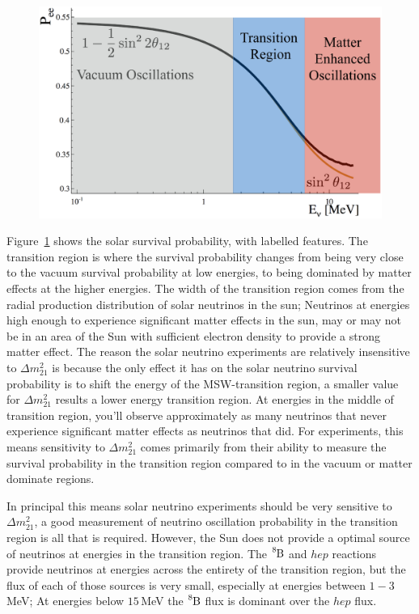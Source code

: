 \begin{figure}[htbp]
    \centering
    \includegraphics[width=\textwidth]{labelled_survival_probability}
    \caption[]{}
    \label{fig:labelled_pee}
\end{figure}

Figure~\ref{fig:labelled_pee} shows the solar survival probability,
with labelled features.
The transition region is where the survival probability changes from
being very close to the vacuum survival probability at low energies,
to being dominated by matter effects at the higher energies.
The width of the transition region comes from the radial production
distribution of solar neutrinos in the sun;
Neutrinos at energies high enough to experience significant matter
effects in the sun, may or may not be in an area of the Sun with sufficient
electron density to provide a strong matter effect.
The reason the solar neutrino experiments are relatively insensitive
to $\Delta m^{2}_{21}$ is because the only effect it has on the
solar neutrino survival probability is to shift the energy
of the MSW-transition region, a smaller value for $\Delta m^{2}_{21}$ results
a lower energy transition region.
At energies in the middle of transition region, you'll observe approximately
as many neutrinos that never experience significant matter effects as neutrinos
that did.
For experiments, this means sensitivity to $\Delta m^{2}_{21}$ comes
primarily from their ability to measure the survival probability in the
transition region compared to in the vacuum or matter dominate regions.

In principal this means solar neutrino experiments should be very sensitive
to $\Delta m^{2}_{21}$, a good measurement of neutrino oscillation probability
in the transition region is all that is required.
However, the Sun does not provide a optimal source of neutrinos at energies
in the transition region.
The $\ce{^{8}B}$ and $hep$ reactions provide neutrinos at energies across the
entirety of the transition region, but the flux of each of those sources is
very small, especially at energies between $1-3$\,MeV\@;
At energies below $15$\,MeV the $\ce{^{8}B}$ flux is dominant over the $hep$
flux.


